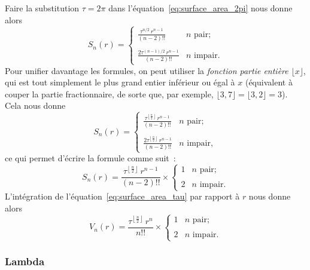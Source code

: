 Faire la substitution $\tau=2\pi$ dans l'équation~\eqref{eq:surface_area_2pi}
nous donne alors
\[
S_n(r) = \begin{cases}
\displaystyle \frac{\tau^{n/2}\,r^{n-1}}{(n-2)!!} & n \text{ pair}; \\ \\
\displaystyle \frac{2\tau^{(n-1)/2}\,r^{n-1}}{(n-2)!!} & n \text{ impair}.
\end{cases} \]
Pour unifier davantage les formules, on peut utiliser la \emph{fonction partie
entière} $\lfloor x \rfloor$, qui est tout simplement le plus grand entier
inférieur ou égal à $x$ (équivalent à couper la partie fractionnaire, de sorte
que, par exemple, $\lfloor 3{,}7 \rfloor = \lfloor 3{,}2 \rfloor = 3$). Cela
nous donne
\[ S_n(r) = \begin{cases}
 \displaystyle \frac{\tau^{\left\lfloor \frac{n}{2} \right\rfloor}\,r^{n-1}}{(n-2)!!} & n \text{ pair}; \\ \\
 \displaystyle \frac{2\tau^{\left\lfloor \frac{n}{2} \right\rfloor}\,r^{n-1}}{(n-2)!!} & n \text{ impair},
 \end{cases} \]
ce qui permet d'écrire la formule comme suit~:
\begin{equation}
\label{eq:surface_area_tau}
S_n(r) = \frac{\tau^{\left\lfloor \frac{n}{2} \right\rfloor}\,r^{n-1}}{(n-2)!!}\times \begin{cases}
1 & n \text{ pair}; \\ \\
2 & n \text{ impair}.
\end{cases}
\end{equation}
L'intégration de l'équation~\eqref{eq:surface_area_tau} par rapport à $r$ nous donne
alors
\begin{equation}
\label{eq:volume_tau}
V_n(r) = \frac{\tau^{\left\lfloor \frac{n}{2} \right\rfloor}\,r^n}{n!!}\times \begin{cases}
1 & n \text{ pair}; \\ \\
2 & n \text{ impair}.
\end{cases}
\end{equation}

\subsubsection{Lambda} %
\label{sec:lambda}

